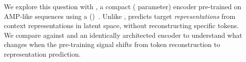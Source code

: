 We explore this question with \projectname{}, a compact (\encoderparams{}
parameter) encoder pre-trained on \corpussize{} AMP-like sequences using a
\jepafull{} (\jepa{})~\citep{jepa_assran}.
Unlike \mlmenc{}, \jepa{} predicts target \emph{representations} from context
representations in latent space, without reconstructing specific tokens.
We compare \projectname{} against \esmtwo{} and an identically architected
\mlmenc{} encoder to understand what changes when the pre-training signal
shifts from token reconstruction to representation prediction.

